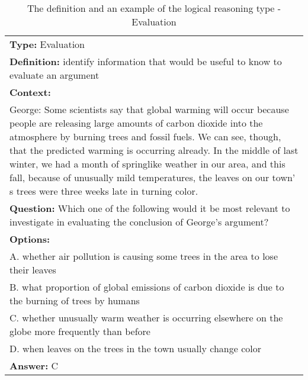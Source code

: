 \documentclass{article} \usepackage{iclr2020_conference,times}
\begin{document}
\begin{table}
	\small
	\centering
	\caption{The definition and an example of the logical reasoning type - Evaluation}
	\begin{tabular}{|p{}|}
		\hline
		{\bf Type: } Evaluation\\
		{\bf Definition: }identify information that would be useful to know to evaluate an argument\\
		\hline
 \textbf{Context: }\\
 George: Some scientists say that global warming will occur because people are releasing large amounts of carbon dioxide into the atmosphere by burning trees and fossil fuels. We can see, though, that the predicted warming is occurring already. In the middle of last winter, we had a month of springlike weather in our area, and this fall, because of unusually mild temperatures, the leaves on our town' s trees were three weeks late in turning color.\\
 \textbf{Question: }Which one of the following would it be most relevant to investigate in evaluating the conclusion of George's argument?\\
 \textbf{Options: }\\
 A. whether air pollution is causing some trees in the area to lose their leaves\\
 B. what proportion of global emissions of carbon dioxide is due to the burning of trees by humans\\
 C. whether unusually warm weather is occurring elsewhere on the globe more frequently than before\\
 D. when leaves on the trees in the town usually change color\\
 \textbf{Answer: } C\\
		\hline
	\end{tabular}
	\label{tab:evaluation}
\end{table}
\end{document}
